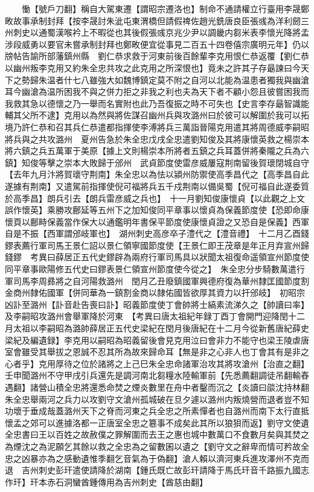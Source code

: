 　　慟【號戶刀翻】稱自大駕東遷【謂昭宗遷洛也】制命不通請權立行臺用李晟鄭畋故事承制封拜【按李晟討朱泚屯東渭橋但請假禆佐趙光銑唐良臣張彧為洋利劒三州刺史以通蜀漢喉衿上不暇從也其後假張彧京兆少尹以調畿内芻米表李懷光降將孟涉段威勇以要官未嘗承制封拜也鄭畋便宜從事見二百五十四卷僖宗廣明元年】仍以牓帖告諭所部藩鎮州縣　劉仁恭求救于河東前後百餘輩李克用恨仁恭返覆【劉仁恭以幽州叛李克用又約朱全忠共攻之此克用之所深恨也】竟未之許其子存朂諫曰今天下之勢歸朱温者什七八雖強大如魏博鎮定莫不附之自河以北能為温患者獨我與幽滄耳今幽滄為温所困我不與之併力拒之非我之利也夫為天下者不顧小怨且彼嘗困我而我救其急以德懷之乃一舉而名實附也此乃吾復振之時不可失也【史言李存朂智識能輔其父所不逮】克用以為然與將佐謀召幽州兵與攻潞州曰於彼可以解圍於我可以拓境乃許仁恭和召其兵仁恭遣都指揮使李溥將兵三萬詣晉陽克用遣其將周德威李嗣昭將兵與之共攻潞州　夏州告急於朱全忠戊戌全忠遣劉知俊及其將康懷英救之楊崇本將六鎮之兵五萬軍于美原【據上文則楊崇本所將者五鎮之兵耳蓋併將秦隴之兵為六鎮】知俊等擊之崇本大敗歸于邠州　武貞節度使雷彦威屢寇荆南留後賀瓌閉城自守【去年九月汴將賀瓌守荆南】朱全忠以為怯以潁州防禦使高季昌代之【高季昌自此遂據有荆南】又遣駕前指揮使倪可福將兵五千戍荆南以備吳蜀【倪可福自此遂委質於高季昌】朗兵引去【朗兵雷彦威之兵也】　十一月劉知俊康懷貞【以此觀之上文誤作懷英】乘勝攻鄜延等五州下之加知俊同平章事以懷貞為保義節度使【恐即命康懷頁以鄜畤保義當作保大以通鑑明年書保平節度使康懷貞證之又恐自是保義】西軍自是不振【西軍謂邠岐軍也】　湖州刺史高彦卒子澧代之【澧音禮】　十二月乙酉錢鏐表薦行軍司馬王景仁詔以景仁領寧國節度使【王景仁即王茂章是年正月弃宣州歸錢鏐　考異曰薛居正五代史鏐辟為兩府行軍司馬具以狀聞太祖復命遥領宣州節度使同平章事歐陽修五代史曰鏐表景仁領宣州節度使今從之】　朱全忠分步騎數萬遣行軍司馬李周彞將之自河陽救潞州　閏月乙丑廢鎮國軍興德府復為華州隸匡國節度割金商州隸佑國軍【併同華為一鎮割金商以隸佑國皆欲厚其資力以扞邠岐】　初昭宗凶訃至潞州【訃音赴告喪曰訃】昭義節度使丁會帥將士縞素流涕久之【帥讀曰率】及李嗣昭攻潞州會舉軍降於河東　【考異曰唐太祖紀年録丁酉丁會開門迎降閏十二月太祖以李嗣昭為潞帥薛居正五代史梁紀在閏月後唐紀在十二月今從新舊唐紀薛史梁紀及編遺録】李克用以嗣昭為昭義留後會見克用泣曰會非力不能守也梁王陵虐唐室會雖受其舉拔之恩誠不忍其所為故來歸命耳【無是非之心非人也丁會其有是非之心者乎】克用厚待之位於諸將之上己巳朱全忠命諸軍治攻其將攻滄州【治直之翻】壬申聞潞州不守甲戌引兵還先是調河南北芻糧水陸輸軍前【先悉薦翻調徒吊翻輸舂遇翻】諸營山積全忠將還悉命焚之煙炎數里在舟中者鑿而沉之【炎讀曰燄沈持林翻朱全忠舉兩河之兵力以攻劉守文滄州孤城破在旦夕遽以潞州内叛燒營而退者豈不知功壞于垂成哉蓋潞州天下之脊而河東之兵全忠之所素憚者也自潞州而南下太行直抵懷孟之郊可以進據洛都一正唐室全忠之簒事不成矣此其所以狼狽而返】劉守文使遺全忠書曰王以百姓之故赦僕之罪解圍而去王之惠也城中數萬口不食數月矣與其焚之為煙沈之為泥願乞其餘以救之全忠為之留數囷以遺之【劉守文之辭卑而情可矜故全忠之凶暴亦為之感動遺惟季翻乞音氣為于偽翻】滄人賴以濟河東兵進攻澤州不克而退　吉州刺史彭玕遣使請降於湖南【鍾氏既亡故彭玕請降于馬氏玕音千路振九國志作玕】玕本赤石洞蠻酋鍾傳用為吉州刺史【酋慈由翻】

